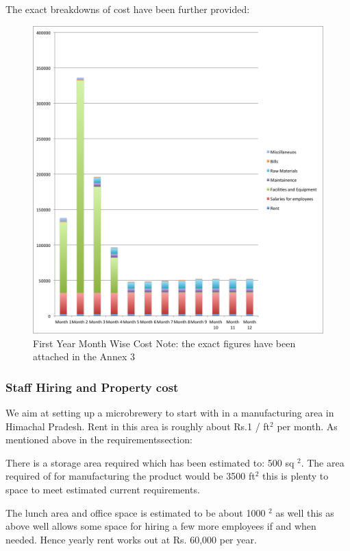 \documentclass[11pt]{article}
\begin{document}
The exact breakdowns of cost have been further provided:

	\begin{figure}[H]
	\caption{First Year Month Wise Cost \newline Note: the exact figures have been
attached in the Annex 3}
	\centering
	\includegraphics[width=\textwidth]{monthWiseCost.png}
	\end{figure}

      \subsubsection{Staff Hiring and Property cost}
We aim at setting up a microbrewery to start with in a manufacturing area in 
Himachal Pradesh. Rent in this area is roughly about Rs.1 / ft$^2$ per month. As
mentioned above in the requirementssection:

There is a storage area required which has been estimated to: 500 sq $^2$.
The area required of for manufacturing the product would be 3500 ft$^2$ this
is plenty to space to meet estimated current requirements.

The lunch area and office space is estimated to be about 1000 $^2$ as well this
as above well allows some space for hiring a few more employees if and when
needed. Hence yearly rent works out at Rs. 60,000 per year.
\end{document}
